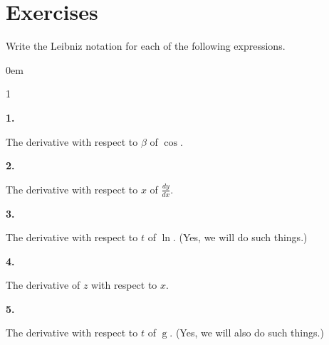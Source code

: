 \documentclass[12pt,]{book}
\theoremstyle{plain}
\theoremstyle{definition}
\numberwithin{equation}{section}
\newenvironment{exercisegroup}%
{\medskip\noindent}%
{\par\bigskip}%
\newlength{\exercisegroupindent}%
\newlength{\exercisegroupitemwidth}%
\newenvironment{exercisegrouplist}%
{\vspace{-\partopsep}%
\begin{adjustwidth}{\exercisegroupindent}{0em}}%
{\end{adjustwidth}%
\vspace{-\partopsep}%
\vspace{\baselineskip}}%
\newenvironment{exercisegroupbycol}[1]%
{\begin{exercisegrouplist}%
\vspace{-\multicolsep}%
\begin{multicols}{#1}%
\setlength{\parindent}{0em}%
\setlength{\exercisegroupitemwidth}{\linewidth}}%
{\end{multicols}%
\vspace{-\multicolsep}%
\end{exercisegrouplist}}%
\newenvironment{exercisegroupitem}[1]%
{\begin{minipage}[t]{\exercisegroupitemwidth}
\vspace{0pt}%
{\bfseries#1}%
\rule{0pt}{\baselineskip}}{\strut%
\end{minipage}%
\hspace{\columnsep}}%
\providecommand\phantomsection{}
\newcommand{\fe}[2]{\mathop{{#1}{\left(#2\right)}}}
\newcommand{\lz}[2]{\frac{d#1}{d#2}}
\begin{document}
\section*{Exercises}\label{exercises-30}

\begin{exercisegroup}%
Write the Leibniz notation for each of the following expressions.%
\par
\begin{exercisegroupbycol}{1}%
\begin{exercisegroupitem}{1. }\phantomsection\hypertarget{exercise-282}{\null}
The derivative with respect to \(\beta\) of \(\fe{\cos}{\beta}\).%
\end{exercisegroupitem}%
\par%
\begin{exercisegroupitem}{2. }\phantomsection\hypertarget{exercise-283}{\null}
The derivative with respect to \(x\) of \(\lz{y}{x}\).%
\end{exercisegroupitem}%
\par%
\begin{exercisegroupitem}{3. }\phantomsection\hypertarget{exercise-284}{\null}
The derivative with respect to \(t\) of \(\fe{\ln}{t}\).  (Yes, we will do such things.)%
\end{exercisegroupitem}%
\par%
\begin{exercisegroupitem}{4. }\phantomsection\hypertarget{exercise-285}{\null}
The derivative of \(z\) with respect to \(x\).%
\end{exercisegroupitem}%
\par%
\begin{exercisegroupitem}{5. }\phantomsection\hypertarget{exercise-286}{\null}
The derivative with respect to \(t\) of \(\fe{g}{8}\).  (Yes, we will also do such things.)%
\end{exercisegroupitem}%
\par%
\end{exercisegroupbycol}%
\end{exercisegroup}%
\typeout{************************************************}
\typeout{************************************************}
\end{document}
